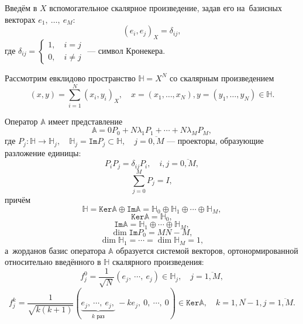 Введём в \( X \) вспомогательное скалярное произведение, задав его на~базисных векторах
\( e_1,~\ldots,~e_M \):
\[ (e_i,e_j)_X = \delta_{ij}, \]
где \( \delta_{ij} = \left\{\begin{aligned} 1, \quad i=j\\ 0, \quad i\neq j\end{aligned}\right. \) --- символ Кронекера.

Рассмотрим евклидово пространство \( \mathbb{H}=X^N \)
со скалярным произведением
\[ (x, y) = \sum_{i=1}^N (x_i,y_i)_X, \quad x=(x_1,\ldots,x_N),y=(y_1,\ldots,y_N) \in \mathbb{H}. \] 

 \begin{theorem}
     Оператор \( \mathbb{A} \) имеет представление
     \begin{equation}\label{eq:ideal:spectral-decomposition}
        \mathbb{A} = 0 P_0 + N\lambda_1 P_1 + \cdots + N\lambda_M P_M,
     \end{equation}
     где \( P_j:\mathbb{H}\to\mathbb{H}_j, \quad \mathbb{H}_j = \mathtt{Im}P_j \subset \mathbb{H}, \quad j=\overline{0,M} \)
     --- проекторы, образующие разложение единицы:
     \[
         P_i P_j = \delta_{ij} P_i, \quad i,j=\overline{0,M},
        \]
     \[
         \sum_{j=0}^M P_j = I,
        \]
     причём
     \[
        \mathbb{H} = \mathtt{Ker}\mathbb{A} \oplus \mathtt{Im}\mathbb{A} = \mathbb{H}_0 \oplus \mathbb{H}_1 \oplus \cdots \oplus \mathbb{H}_M,
        \]
     \[
        \mathtt{Ker}\mathbb{A} = \mathbb{H}_0,
        \]
     \[
        \mathtt{Im}\mathbb{A} = \mathbb{H}_1 \oplus \cdots \oplus \mathbb{H}_M, \]
     \[ 
        \dim{\mathtt{Im}{P_0}} = MN-M, \]
     \[
        \dim{\mathbb{H}_1} = \cdots = \dim{\mathbb{H}_M} = 1,
        \]
     а~жорданов базис оператора \( \mathbb{A} \) образуется системой векторов,
     ортонормированной относительно введённого в \( \mathbb{H} \) скалярного произведения:
     \begin{equation}\label{eq:ideal:jbasis-im}
         f_j^0 = \frac{1}{\sqrt{N}}\left( e_j,~\cdots,~e_j\right)\in\mathbb{H}_j,\quad
     j=\overline{1,M}, \end{equation}
     \begin{equation}\label{eq:ideal:jbasis-ker}
         f_j^k = \frac{1}{\sqrt{k(k+1)}}
                ({
                    \underbrace{e_j, ~ \cdots, ~ e_j,}_{ k \text{ раз}} ~ -ke_j, ~ 0, ~ \cdots, ~ 0
                    })
                    \in\mathtt{Ker}\mathbb{A},
                    \quad k=\overline{1,N-1},j=\overline{1,M}
     .\end{equation} %
 \end{theorem}
